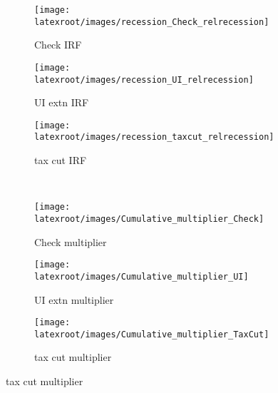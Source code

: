 \documentclass[qe]{econsocart}
\begin{document}
\begin{figure}[H] %
  \centering
  \caption{Policy effectiveness during recessions with aggregate demand effects}
  \label{fig:Policyrelrecession} 
    \centering
    \begin{subfigure}[b]{.32\linewidth}
      \centering
      \texttt{[image: \\latexroot/images/recession\_Check\_relrecession]}
      \caption{Check IRF}
      \label{fig:recessioncheckrelrecession} 
    \end{subfigure}
    \hfill%
    \begin{subfigure}[b]{.32\linewidth}
      \centering
      \texttt{[image: \\latexroot/images/recession\_UI\_relrecession]}
      \caption{UI extn IRF}
      \label{fig:recessionuirelrecession} 
    \end{subfigure}
    \hfill%
    \begin{subfigure}[b]{.32\linewidth}
      \centering
      \texttt{[image: \\latexroot/images/recession\_taxcut\_relrecession]}
      \caption{tax cut IRF}
      \label{fig:recessiontaxcutrelrecession} 
    \end{subfigure}
    \\[1.5em]
    \begin{subfigure}[b]{.32\linewidth}
      \centering
      \texttt{[image: \\latexroot/images/Cumulative\_multiplier\_Check]}
      \caption{Check multiplier}
      \label{fig:recessioncheckrelrecession_Mult} 
    \end{subfigure}
    \hfill%
    \begin{subfigure}[b]{.32\linewidth}
      \centering
      \texttt{[image: \\latexroot/images/Cumulative\_multiplier\_UI]}
      \caption{UI extn multiplier}
      \label{fig:recessionuirelrecession_Mult} 
    \end{subfigure}
    \hfill%
    \begin{subfigure}[b]{.32\linewidth}
      \centering
      \texttt{[image: \\latexroot/images/Cumulative\_multiplier\_TaxCut]}
      \caption{tax cut multiplier}
      \label{fig:recessiontaxcutrelrecession_Mult} 
    \end{subfigure}
\end{figure}
\end{document}
